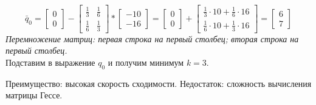 \documentclass[12pt,a5paper]{scrbook}
\begin{document}
  $$\bar{q}_0 = \begin{bmatrix}
    0 \\
    0
  \end{bmatrix} - \begin{bmatrix}
    \frac{1}{3} & \frac{1}{6} \\[0.3em]
    \frac{1}{6} & \frac{1}{3}
  \end{bmatrix} \ast \begin{bmatrix}
    -10 \\
    -16
  \end{bmatrix} = \begin{bmatrix}
    0 \\
    0
  \end{bmatrix} + \begin{bmatrix}
    \frac{1}{3}\cdot 10 + \frac{1}{6}\cdot 16 \\
    \frac{1}{6}\cdot 10 + \frac{1}{3}\cdot 16
  \end{bmatrix} = \begin{bmatrix}
    6 \\
    7
  \end{bmatrix}$$
  \textit{Перемножение матриц: первая строка на первый столбец; вторая строка на первый столбец.}\\
  Подставим в выражение $q_0$ и получим минимум $k=3$.\par
  Преимущество: высокая скорость сходимости.
  Недостаток: сложность вычисления матрицы Гессе. 
\end{document}
